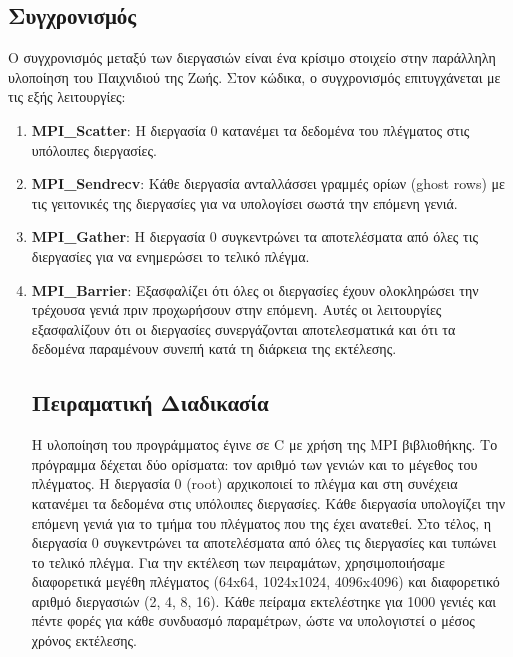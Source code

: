 \documentclass{article}
\begin{document}
\subsection*{Συγχρονισμός}
Ο συγχρονισμός μεταξύ των διεργασιών είναι ένα κρίσιμο στοιχείο στην παράλληλη υλοποίηση του Παιχνιδιού της Ζωής. Στον κώδικα, ο συγχρονισμός επιτυγχάνεται με τις εξής λειτουργίες:
\begin{enumerate}
    \item \textbf{MPI_Scatter}: Η διεργασία 0 κατανέμει τα δεδομένα του πλέγματος στις υπόλοιπες διεργασίες.
    \item \textbf{MPI_Sendrecv}: Κάθε διεργασία ανταλλάσσει γραμμές ορίων (ghost rows) με τις γειτονικές της διεργασίες για να υπολογίσει σωστά την επόμενη γενιά.
    \item \textbf{MPI_Gather}: Η διεργασία 0 συγκεντρώνει τα αποτελέσματα από όλες τις διεργασίες για να ενημερώσει το τελικό πλέγμα.
    \item \textbf{MPI_Barrier}: Εξασφαλίζει ότι όλες οι διεργασίες έχουν ολοκληρώσει την τρέχουσα γενιά πριν προχωρήσουν στην επόμενη.
Αυτές οι λειτουργίες εξασφαλίζουν ότι οι διεργασίες συνεργάζονται αποτελεσματικά και ότι τα δεδομένα παραμένουν συνεπή κατά τη διάρκεια της εκτέλεσης.
\subsection*{Πειραματική Διαδικασία}
Η υλοποίηση του προγράμματος έγινε σε C με χρήση της MPI βιβλιοθήκης. Το πρόγραμμα δέχεται δύο ορίσματα: τον αριθμό των γενιών και το μέγεθος του πλέγματος. Η διεργασία 0 (root) αρχικοποιεί το πλέγμα και στη συνέχεια κατανέμει τα δεδομένα στις υπόλοιπες διεργασίες. Κάθε διεργασία υπολογίζει την επόμενη γενιά για το τμήμα του πλέγματος που της έχει ανατεθεί. Στο τέλος, η διεργασία 0 συγκεντρώνει τα αποτελέσματα από όλες τις διεργασίες και τυπώνει το τελικό πλέγμα.
Για την εκτέλεση των πειραμάτων, χρησιμοποιήσαμε διαφορετικά μεγέθη πλέγματος (64x64, 1024x1024, 4096x4096) και διαφορετικό αριθμό διεργασιών (2, 4, 8, 16). Κάθε πείραμα εκτελέστηκε για 1000 γενιές και πέντε φορές για κάθε συνδυασμό παραμέτρων, ώστε να υπολογιστεί ο μέσος χρόνος εκτέλεσης.

\end{enumerate}
\end{document}
